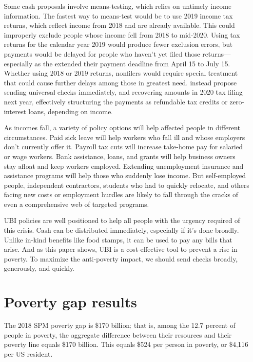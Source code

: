 \documentclass[12pt]{article}
\begin{document}
Some cash proposals involve means-testing, which relies on untimely income information. The fastest way to means-test would be to use 2019 income tax returns, which reflect income from 2018 and are already available. This could improperly exclude people whose income fell from 2018 to mid-2020. Using tax returns for the calendar year 2019 would produce fewer exclusion errors, but payments would be delayed for people who haven't yet filed those returns---especially as the  extended their payment deadline from April 15 to July 15. Whether using 2018 or 2019 returns, nonfilers would require special treatment that could cause further delays among those in greatest need.  instead propose sending universal checks immediately, and recovering amounts in 2020 tax filing next year, effectively structuring the payments as refundable tax credits or zero-interest loans, depending on income.

As incomes fall, a variety of policy options will help affected people in different circumstances. Paid sick leave will help workers who fall ill and whose employers don't currently offer it. Payroll tax cuts will increase take-home pay for salaried or wage workers. Bank assistance, loans, and grants will help business owners stay afloat and keep workers employed. Extending unemployment insurance and assistance programs will help those who suddenly lose income. But self-employed people, independent contractors, students who had to quickly relocate, and others facing new costs or employment hurdles are likely to fall through the cracks of even a comprehensive web of targeted programs.

UBI policies are well positioned to help all people with the urgency required of this crisis. Cash can be distributed immediately, especially if it's done broadly. Unlike in-kind benefits like food stamps, it can be used to pay any bills that arise. And as this paper shows, UBI is a cost-effective tool to prevent a rise in poverty. To maximize the anti-poverty impact, we should send checks broadly, generously, and quickly.

\appendix
\section{Poverty gap results} \label{sec:appendixa}

The 2018 SPM poverty gap is \$170 billion; that is, among the 12.7 percent of people in poverty, the aggregate difference between their resources and their poverty line equals \$170 billion. This equals \$524 per person in poverty, or \$4,116 per US resident.
\end{document}
